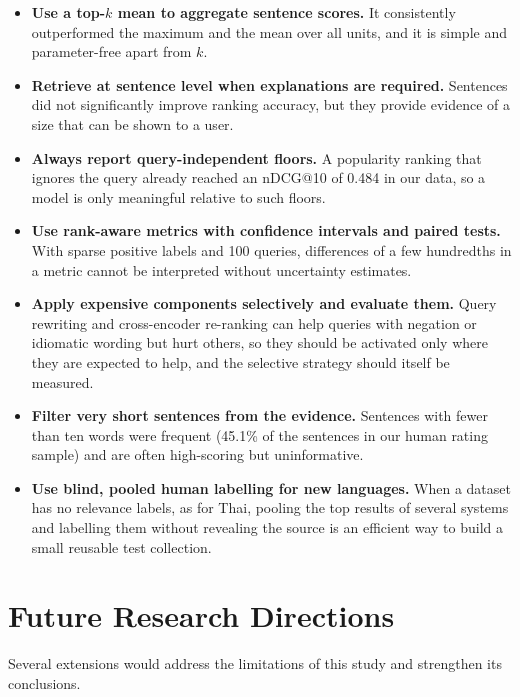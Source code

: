 \begin{itemize}
    \item \textbf{Use a top-$k$ mean to aggregate sentence scores.} It consistently outperformed the maximum and the mean over all units, and it is simple and parameter-free apart from $k$.
    \item \textbf{Retrieve at sentence level when explanations are required.} Sentences did not significantly improve ranking accuracy, but they provide evidence of a size that can be shown to a user.
    \item \textbf{Always report query-independent floors.} A popularity ranking that ignores the query already reached an nDCG@10 of 0.484 in our data, so a model is only meaningful relative to such floors.
    \item \textbf{Use rank-aware metrics with confidence intervals and paired tests.} With sparse positive labels and 100 queries, differences of a few hundredths in a metric cannot be interpreted without uncertainty estimates.
    \item \textbf{Apply expensive components selectively and evaluate them.} Query rewriting and cross-encoder re-ranking can help queries with negation or idiomatic wording but hurt others, so they should be activated only where they are expected to help, and the selective strategy should itself be measured.
    \item \textbf{Filter very short sentences from the evidence.} Sentences with fewer than ten words were frequent (45.1\% of the sentences in our human rating sample) and are often high-scoring but uninformative.
    \item \textbf{Use blind, pooled human labelling for new languages.} When a dataset has no relevance labels, as for Thai, pooling the top results of several systems and labelling them without revealing the source is an efficient way to build a small reusable test collection.
\end{itemize}

\section{Future Research Directions}
\label{sec:futurework}

Several extensions would address the limitations of this study and strengthen its conclusions.

